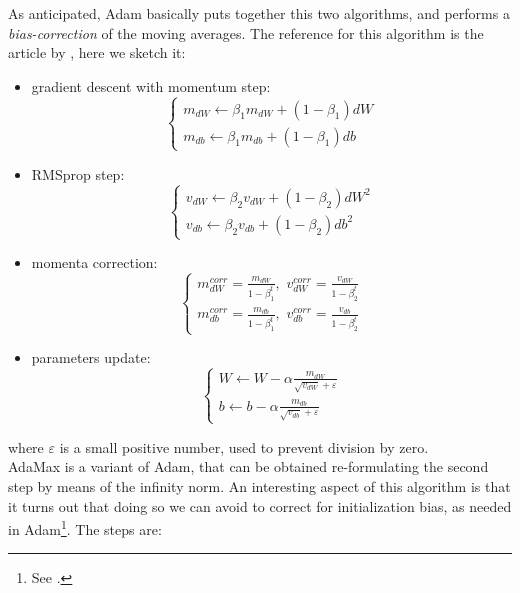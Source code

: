 \documentclass[12pt, a4paper]{report}
\theoremstyle{definition}
\begin{document}
\newline \noindent As anticipated, Adam basically puts together this two algorithms, and performs a \textit{bias-correction} of the moving averages. The reference for this algorithm is the article by \cite{Kingma}, here we sketch it:
\begin{itemize}\label{Adam}
	\item gradient descent with momentum step:
	\begin{equation*}
	\begin{cases}
	m_{dW}\longleftarrow\beta_1 m_{dW} + (1-\beta_1) dW\\
	m_{db}\longleftarrow\beta_1 m_{db} + (1-\beta_1) db
	\end{cases}
	\end{equation*}
	\item RMSprop step:
	\begin{equation*}
	\begin{cases}
	v_{dW}\longleftarrow\beta_2 v_{dW} + (1-\beta_2) dW^2\\
	v_{db}\longleftarrow\beta_2 v_{db} + (1-\beta_2) db^2
	\end{cases}
	\end{equation*}
	\item momenta correction:
	\begin{equation*}
	\begin{cases}
	m_{dW}^{corr}=\frac{m_{dW}}{1-\beta_1^t},\,\, v_{dW}^{corr}=\frac{v_{dW}}{1-\beta_2^t}\\
	m_{db}^{corr}=\frac{m_{db}}{1-\beta_1^t},\,\, v_{db}^{corr}=\frac{v_{db}}{1-\beta_2^t}
	\end{cases}
	\end{equation*}
	\item parameters update:
	\begin{equation*}
	\begin{cases}
	W\longleftarrow W - \alpha \frac{m_{dW}}{\sqrt{v_{dW}}+\varepsilon}\\
	b\longleftarrow b - \alpha \frac{m_{db}}{\sqrt{v_{db}}+\varepsilon}
	\end{cases}
	\end{equation*}
\end{itemize}
where $\varepsilon$ is a small positive number, used to prevent division by zero.\\
\newline \noindent AdaMax is a variant of Adam, that can be obtained re-formulating the second step by means of the infinity norm. An interesting aspect of this algorithm is that it turns out that doing so we can avoid to correct for initialization bias, as needed in Adam\footnote{See \cite{Kingma}.}. The steps are:
\end{document}
